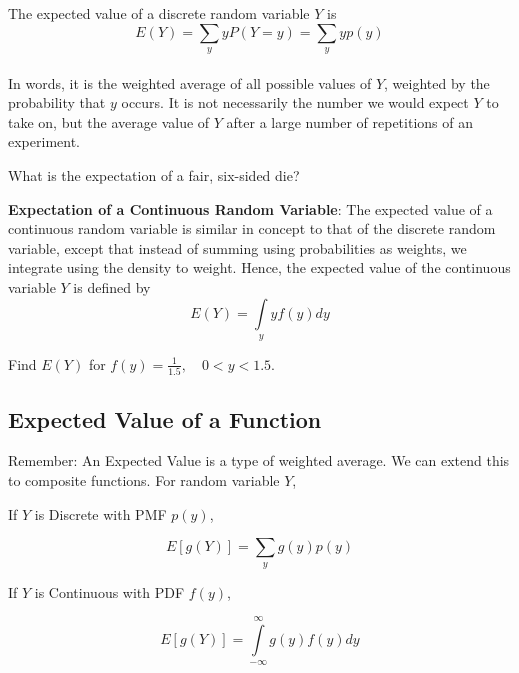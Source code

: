 \documentclass[
]{book}
\begin{document}
\begin{definition}
\protect\hypertarget{def:unnamed-chunk-83}{}\label{def:unnamed-chunk-83}The expected value of a discrete random variable \(Y\) is \[E(Y)=\sum\limits_{y} y P(Y=y)= \sum\limits_{y} y p(y)\]\\
In words, it is the weighted average of all possible values of \(Y\), weighted by the probability that \(y\) occurs. It is not necessarily the number we would expect \(Y\) to take on, but the average value of \(Y\) after a large number of repetitions of an experiment.
\end{definition}

\begin{example}
\protect\hypertarget{exm:expectdiscrete}{}\label{exm:expectdiscrete}What is the expectation of a fair, six-sided die?
\end{example}

\textbf{Expectation of a Continuous Random Variable}: The expected
value of a continuous random variable is similar in concept to that of
the discrete random variable, except that instead of summing using
probabilities as weights, we integrate using the density to weight.
Hence, the expected value of the continuous variable \(Y\) is defined by
\[E(Y)=\int\limits_{y} y f(y) dy\]

\begin{example}
\protect\hypertarget{exm:expectconti}{}\label{exm:expectconti}Find \(E(Y)\) for \(f(y)=\frac{1}{1.5}, \quad 0<y<1.5\).
\end{example}

\hypertarget{expected-value-of-a-function}{%
\subsection*{Expected Value of a Function}\label{expected-value-of-a-function}}

Remember: An Expected Value is a type of weighted average. We can extend this to composite functions. For random variable \(Y\),

If \(Y\) is Discrete with PMF \(p(y)\),

\[E[g(Y)]=\sum\limits_y g(y)p(y)\]

If \(Y\) is Continuous with PDF \(f(y)\),

\[E[g(Y)]=\int\limits_{-\infty}^\infty g(y)f(y)dy\]
\end{document}
